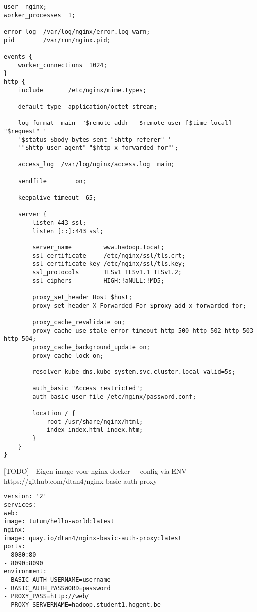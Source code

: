 \begin{lstlisting}
user  nginx;
worker_processes  1;

error_log  /var/log/nginx/error.log warn;
pid        /var/run/nginx.pid;

events {
    worker_connections  1024;
}
http {
    include       /etc/nginx/mime.types;
    
    default_type  application/octet-stream;
    
    log_format  main  '$remote_addr - $remote_user [$time_local] "$request" '
    '$status $body_bytes_sent "$http_referer" '
    '"$http_user_agent" "$http_x_forwarded_for"';
    
    access_log  /var/log/nginx/access.log  main;
    
    sendfile        on;
    
    keepalive_timeout  65;
    
    server {
        listen 443 ssl;
        listen [::]:443 ssl;
        
        server_name         www.hadoop.local;
        ssl_certificate     /etc/nginx/ssl/tls.crt;
        ssl_certificate_key /etc/nginx/ssl/tls.key;
        ssl_protocols       TLSv1 TLSv1.1 TLSv1.2;
        ssl_ciphers         HIGH:!aNULL:!MD5;
        
        proxy_set_header Host $host;
        proxy_set_header X-Forwarded-For $proxy_add_x_forwarded_for;
        
        proxy_cache_revalidate on;
        proxy_cache_use_stale error timeout http_500 http_502 http_503 http_504;
        proxy_cache_background_update on;
        proxy_cache_lock on;
        
        resolver kube-dns.kube-system.svc.cluster.local valid=5s;
        
        auth_basic "Access restricted";
        auth_basic_user_file /etc/nginx/password.conf;
        
        location / {
            root /usr/share/nginx/html;
            index index.html index.htm;
        }
    }
}
\end{lstlisting}

[TODO] - Eigen image voor nginx docker + config via ENV
https://github.com/dtan4/nginx-basic-auth-proxy
\newline
\newline
\begin{lstlisting}
version: '2'
services:
web:
image: tutum/hello-world:latest
nginx:
image: quay.io/dtan4/nginx-basic-auth-proxy:latest
ports:
- 8080:80
- 8090:8090
environment:
- BASIC_AUTH_USERNAME=username
- BASIC_AUTH_PASSWORD=password
- PROXY_PASS=http://web/
- PROXY-SERVERNAME=hadoop.student1.hogent.be
\end{lstlisting}

